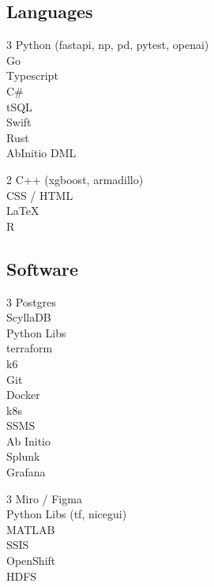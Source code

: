 \documentclass[]{deedy-resume}
\begin{document}
\begin{minipage}[t]{0.33\textwidth}
\subsection{Languages}
\vspace{5pt}
\begin{multicols}{3}
\textbullet{} Python (fastapi, np, pd, pytest, openai) \\
\textbullet{} Go \\
\textbullet{} Typescript\\
\textbullet{} C\# \\
\textbullet{} tSQL  \\
\textbullet{} Swift \\
\textbullet{} Rust \\
\textbullet{} AbInitio DML \\
\end{multicols}
\vspace{5pt}
\begin{multicols}{2}
\textbullet{} C++ (xgboost, armadillo) \\
\textbullet{} CSS / HTML \\
\textbullet{} \LaTeX \\ 
\textbullet{} R \\
\end{multicols}
\vspace{5pt}
\sectionspace
\subsection{Software}
\begin{multicols}{3}
\textbullet{} Postgres \\
\textbullet{} ScyllaDB \\
\textbullet{} Python Libs \\
\textbullet{} terraform \\
\textbullet{} k6 \\
\textbullet{} Git \\
\textbullet{} Docker \\
\textbullet{} k8s \\
\textbullet{} SSMS \\
\textbullet{} Ab Initio \\
\textbullet{} Splunk \\
\textbullet{} Grafana \\
\end{multicols}
\vspace{5pt}
\begin{multicols}{3}
\textbullet{} Miro / Figma \\
\textbullet{} Python Libs (tf, nicegui) \\
\textbullet{} MATLAB \\
\textbullet{} SSIS \\
\textbullet{} OpenShift \\
\textbullet{} HDFS
\end{multicols}



\end{minipage}
\end{document}
